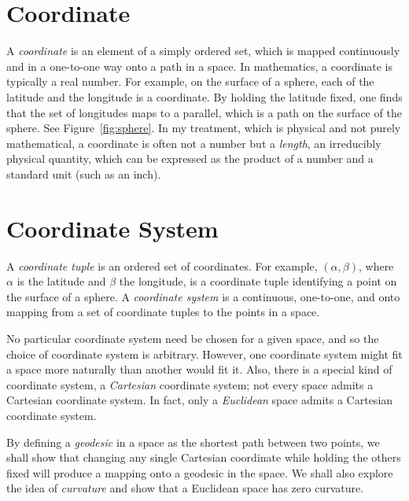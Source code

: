 \section{Coordinate}

A \emph{coordinate} is an element of a simply ordered set,
which is mapped continuously and in a one-to-one way onto a path in a space.
In mathematics, a coordinate is typically a real number.  For example, on the
surface of a sphere, each of the latitude and the longitude is a coordinate.
By holding the latitude fixed, one finds that the set of longitudes maps to a
parallel, which is a path on the surface of the sphere.  See
Figure~\ref{fig:sphere}.  In my treatment, which is physical and not purely
mathematical, a coordinate is often not a number but a \emph{length}, an
irreducibly physical quantity, which can be expressed as the product of a
number and a standard unit (such as an inch).

\section{Coordinate System}

A \emph{coordinate tuple} is an ordered set of coordinates.  For example,
$(\alpha,\beta)$, where $\alpha$ is the latitude and $\beta$ the longitude, is
a coordinate tuple identifying a point on the surface of a sphere.  A
\emph{coordinate system} is a continuous, one-to-one, and onto mapping from a
set of coordinate tuples to the points in a space.

No particular coordinate system need be chosen for a given space, and so the
choice of coordinate system is arbitrary.  However, one coordinate system might
fit a space more naturally than another would fit it.  Also, there is a special
kind of coordinate system, a \emph{Cartesian} coordinate system; not every
space admits a Cartesian coordinate system.  In fact, only a \emph{Euclidean}
space admits a Cartesian coordinate system.

By defining a \emph{geodesic} in a space as the shortest path between two
points, we shall show that changing any single Cartesian coordinate while
holding the others fixed will produce a mapping onto a geodesic in the space.
We shall also explore the idea of \emph{curvature} and show that a Euclidean
space has zero curvature.

